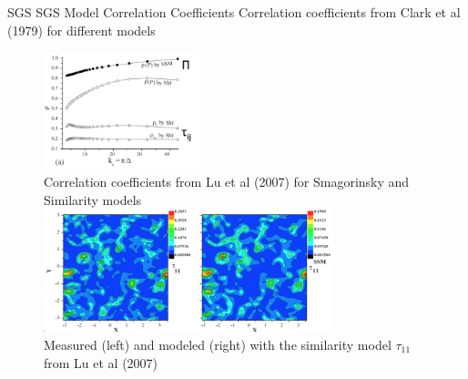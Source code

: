 \begin{frame}{SGS SGS Model Correlation Coefficients}
Correlation coefficients from Clark et al (1979) for different models    \begin{figure}
	\includegraphics[width=0.4\textwidth]{apriori12}~\\\tiny{Correlation coefficients from Lu et al (2007) for Smagorinsky and Similarity models}
	\includegraphics[width=0.75\textwidth]{apriori11}
	~\\\tiny{Measured (left) and modeled (right) with the similarity model $\tau_{11}$ from Lu et al (2007)}
\end{figure}
\end{frame}
